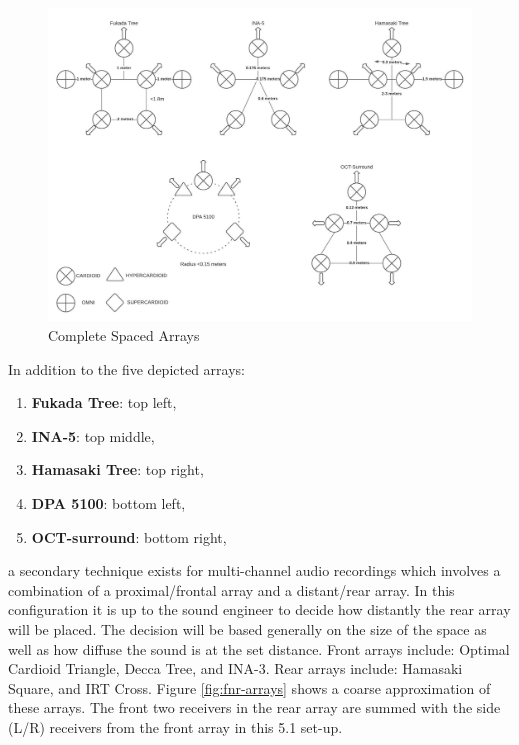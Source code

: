 \begin{figure}[ht!]%
\centering
\includegraphics[width=1.0\textwidth]{img/complete-spaced-arrays.jpeg} 
\caption{Complete Spaced Arrays}
\label{fig:c-spaced-arrays}

\end{figure}


In addition to the five depicted arrays:

\begin{enumerate}
    \item \textbf{Fukada Tree}: top left,%
    \item \textbf{INA-5}: top middle,
    \item \textbf{Hamasaki Tree}: top right,
    \item \textbf{DPA 5100}: bottom left,
    \item \textbf{OCT-surround}: bottom right,
\end{enumerate}


a secondary technique exists for multi-channel audio recordings which involves a combination of a proximal/frontal array and a distant/rear array. In this configuration it is up to the sound engineer to decide how distantly the rear array will be placed. The decision will be based generally on the size of the space as well as how diffuse the sound is at the set distance. Front arrays include: Optimal Cardioid Triangle, Decca Tree, and INA-3. Rear arrays include: Hamasaki Square, and IRT Cross. Figure \ref{fig:fnr-arrays} shows a coarse approximation of these arrays. The front two receivers in the rear array are summed with the side (L/R) receivers from the front array in this 5.1 set-up. 

